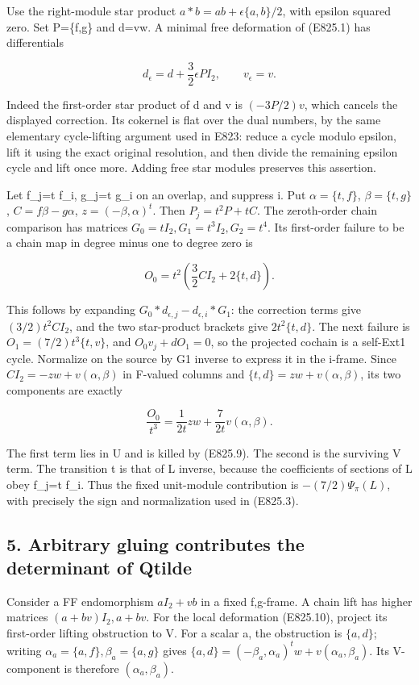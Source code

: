 Use the right-module star product \(a*b=ab+\epsilon\{a,b\}/2\), with
epsilon squared zero. Set P=\{f,g\} and d=vw. A minimal free deformation
of (E825.1) has differentials

\[
 d_\epsilon=d+\frac32\epsilon P I_2,\qquad v_\epsilon=v.
 \tag{E825.10}
\]

Indeed the first-order star product of d and v is \((-3P/2)v\), which
cancels the displayed correction. Its cokernel is flat over the dual
numbers, by the same elementary cycle-lifting argument used in E823:
reduce a cycle modulo epsilon, lift it using the exact original
resolution, and then divide the remaining epsilon cycle and lift once
more. Adding free star modules preserves this assertion.

Let f\_j=t f\_i, g\_j=t g\_i on an overlap, and suppress i. Put
\(\alpha=\{t,f\}\), \(\beta=\{t,g\}\), \(C=f\beta-g\alpha\),
\(z=(-\beta,\alpha)^t\). Then \(P_j=t^2P+tC\). The zeroth-order chain
comparison has matrices \(G_0=tI_2,G_1=t^3I_2,G_2=t^4\). Its first-order
failure to be a chain map in degree minus one to degree zero is

\[
 O_0=t^2\left(\frac32 C I_2+2\{t,d\}\right).
 \tag{E825.11}
\]

This follows by expanding \(G_0*d_{\epsilon,j}-d_{\epsilon,i}*G_1\): the
correction terms give \((3/2)t^2CI_2\), and the two star-product
brackets give \(2t^2\{t,d\}\). The next failure is
\(O_1=(7/2)t^3\{t,v\}\), and \(O_0v_j+dO_1=0\), so the projected cochain
is a self-Ext1 cycle. Normalize on the source by G1 inverse to express
it in the i-frame. Since \(CI_2=-z w+v(\alpha,\beta)\) in F-valued
columns and \(\{t,d\}=z w+v(\alpha,\beta)\), its two components are
exactly

\[
 \frac{O_0}{t^3}
   =\frac{1}{2t}z w+\frac{7}{2t}v(\alpha,\beta).
 \tag{E825.12}
\]

The first term lies in U and is killed by (E825.9). The second is the
surviving V term. The transition t is that of L inverse, because the
coefficients of sections of L obey f\_j=t f\_i. Thus the fixed
unit-module contribution is \(-(7/2)\Psi_\pi(L)\), with precisely the
sign and normalization used in (E825.3).

\subsection{5. Arbitrary gluing contributes the determinant of
Qtilde}\label{SF-E825:arbitrary-gluing-contributes-the-determinant-of-qtilde}

Consider a FF endomorphism \(aI_2+vb\) in a fixed f,g-frame. A chain
lift has higher matrices \((a+bv)I_2,a+bv\). For the local deformation
(E825.10), project its first-order lifting obstruction to V. For a
scalar a, the obstruction is \(\{a,d\}\); writing
\(\alpha_a=\{a,f\},\beta_a=\{a,g\}\) gives
\(\{a,d\}=(-\beta_a,\alpha_a)^tw+v(\alpha_a,\beta_a)\). Its V-component
is therefore \((\alpha_a,\beta_a)\).


